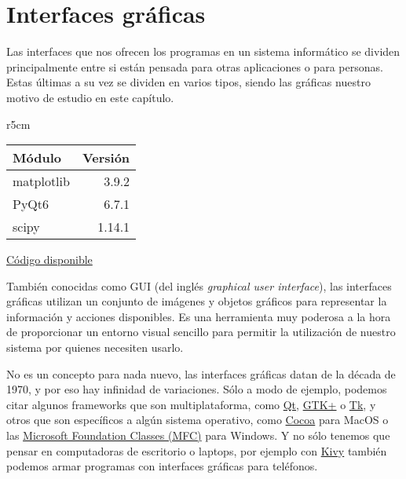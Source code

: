

\chapter{Interfaces gráficas} \label{ch:guis}

Las interfaces que nos ofrecen los programas en un sistema informático se dividen principalmente entre si están pensada para otras aplicaciones o para personas. Estas últimas a su vez se dividen en varios tipos, siendo las gráficas nuestro motivo de estudio en este capítulo.

\begin{wraptable}{r}{5cm}
\begin{modulesinfo}
\begin{center}
{\small
    \begin{tabular}{l r}
        \toprule
        \textbf{Módulo} & \textbf{Versión} \\
        \midrule
        matplotlib & 3.9.2 \\
        PyQt6 & 6.7.1 \\
        scipy & 1.14.1 \\
        \bottomrule
    \end{tabular}
    \vspace{0.75em}

    \href{https://github.com/facundobatista/libro-pyciencia/tree/master/código/guis/}{Código disponible}
}
\end{center}
\end{modulesinfo}
\end{wraptable}

También conocidas como GUI (del inglés \textit{graphical user interface}), las interfaces gráficas utilizan un conjunto de imágenes y objetos gráficos para representar la información y acciones disponibles. Es una herramienta muy poderosa a la hora de proporcionar un entorno visual sencillo para permitir la utilización de nuestro sistema por quienes necesiten usarlo.

No es un concepto para nada nuevo, las interfaces gráficas datan de la década de 1970, y por eso hay infinidad de variaciones. Sólo a modo de ejemplo, podemos citar algunos frameworks que son multiplataforma, como \href{https://www.qt.io/}{Qt}, \href{https://www.gtk.org/}{GTK+} o \href{https://www.tcl.tk/}{Tk}, y otros que son específicos a algún sistema operativo, como \href{https://en.wikipedia.org/wiki/Cocoa_(API)}{Cocoa} para MacOS o las \href{https://learn.microsoft.com/en-us/cpp/mfc/mfc-desktop-applications}{Microsoft Foundation Classes (MFC)} para Windows. Y no sólo tenemos que pensar en computadoras de escritorio o laptops, por ejemplo con \href{https://kivy.org/}{Kivy} también podemos armar programas con interfaces gráficas para teléfonos.

